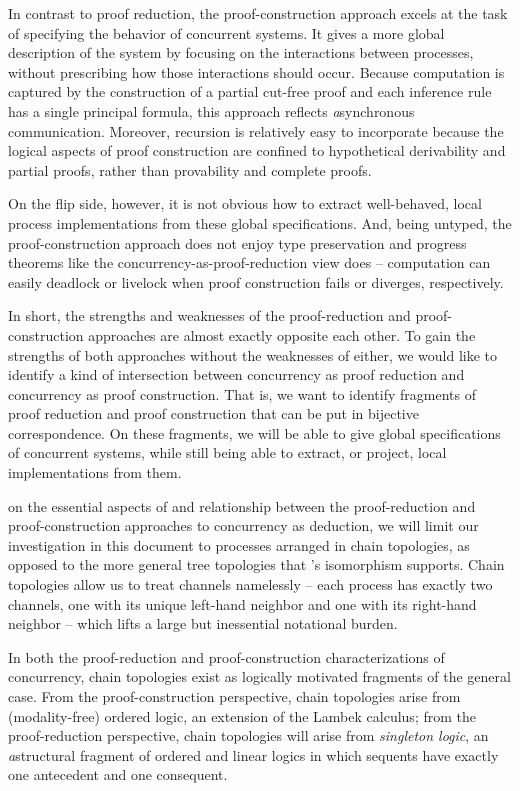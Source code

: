 In contrast to proof reduction, the proof-construction approach excels at the task of specifying the behavior of concurrent systems.
It gives a more global description of the system by focusing on the interactions between processes, without prescribing how those interactions should occur.
Because computation is captured by the construction of a partial cut-free proof and each inference rule has a single principal formula, this approach reflects \emph{a}syn\-chronous communication.
Moreover, recursion is relatively easy to incorporate because the logical aspects of proof construction are confined to hypothetical derivability and partial proofs, rather than provability and complete proofs.

On the flip side, however, it is not obvious how to extract well-behaved, local process implementations from these global specifications.
And, being untyped, the proof-construction approach does not enjoy type preservation and progress theorems like the concurrency-as-proof-reduction view does -- computation can easily deadlock or livelock when proof construction fails or diverges, respectively.

In short, the strengths and weaknesses of the proof-reduction and proof-construction approaches are almost exactly opposite each other.
To gain the strengths of both approaches without the weaknesses of either, we would like to identify a kind of intersection between concurrency as proof reduction and concurrency as proof construction.
That is, we want to identify fragments of proof reduction and proof construction that can be put in bijective correspondence.
On these fragments, we will be able to give global specifications of concurrent systems, while still being able to extract, or project, local implementations from them.

 on the essential aspects of and relationship between the proof-reduction and proof-construction approaches to concurrency as deduction, we will limit our investigation in this document to processes arranged in chain topologies, as opposed to the more general tree topologies that \citeauthor{Caires+:MSCS16}'s isomorphism supports.
Chain topologies allow us to treat channels namelessly -- each process has exactly two channels, one with its unique left-hand neighbor and one with its right-hand neighbor -- which lifts a large but inessential notational burden.

In both the proof-reduction and proof-construction characterizations of concurrency, chain topologies exist as logically motivated fragments of the general case.
From the proof-construction perspective, chain topologies arise from (modality-free) ordered logic\autocites{Lambek:SLIM61}{Abrusci:MLQ90}{Kanazawa:LLI92}{Polakow+Pfenning:MFPS99}, an extension of the Lambek calculus\autocite{Lambek:AMM58};
from the proof-reduction perspective, chain topologies will arise from \emph{singleton logic}\autocites{Santocanale:FOSSACS02}{Fortier+Santocanale:CSL13}, an \emph{a}struc\-tural fragment of ordered and linear logics in which sequents have exactly one antecedent and one consequent.

